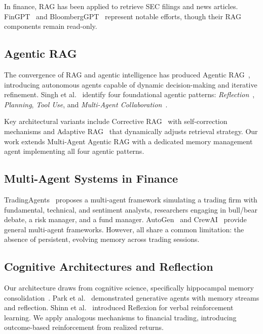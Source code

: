 \documentclass[conference]{IEEEtran}
\begin{document}
In finance, RAG has been applied to retrieve SEC filings and news articles. FinGPT~\cite{yang2023fingpt} and BloombergGPT~\cite{wu2023bloomberggpt} represent notable efforts, though their RAG components remain read-only.

\subsection{Agentic RAG}

The convergence of RAG and agentic intelligence has produced Agentic RAG~\cite{singh2025agenticrag}, introducing autonomous agents capable of dynamic decision-making and iterative refinement. Singh et al.~\cite{singh2025agenticrag} identify four foundational agentic patterns: \textit{Reflection}~\cite{madaan2023selfrefine}, \textit{Planning}, \textit{Tool Use}, and \textit{Multi-Agent Collaboration}~\cite{singh2024agentic}.

Key architectural variants include Corrective RAG~\cite{yan2024crag} with self-correction mechanisms and Adaptive RAG~\cite{jeong2024adaptive} that dynamically adjusts retrieval strategy. Our work extends Multi-Agent Agentic RAG with a dedicated memory management agent implementing all four agentic patterns.

\subsection{Multi-Agent Systems in Finance}

TradingAgents~\cite{tradingagents2024} proposes a multi-agent framework simulating a trading firm with fundamental, technical, and sentiment analysts, researchers engaging in bull/bear debate, a risk manager, and a fund manager. AutoGen~\cite{wu2023autogen} and CrewAI~\cite{crewai2025} provide general multi-agent frameworks. However, all share a common limitation: the absence of persistent, evolving memory across trading sessions.

\subsection{Cognitive Architectures and Reflection}

Our architecture draws from cognitive science, specifically hippocampal memory consolidation~\cite{zhang2024memory}. Park et al.~\cite{park2023generative} demonstrated generative agents with memory streams and reflection. Shinn et al.~\cite{shinn2023reflexion} introduced Reflexion for verbal reinforcement learning. We apply analogous mechanisms to financial trading, introducing outcome-based reinforcement from realized returns.
\end{document}

